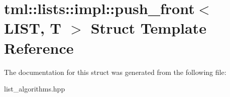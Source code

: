 \hypertarget{structtml_1_1lists_1_1impl_1_1push__front}{\section{tml\+:\+:lists\+:\+:impl\+:\+:push\+\_\+front$<$ L\+I\+S\+T, T $>$ Struct Template Reference}
\label{structtml_1_1lists_1_1impl_1_1push__front}
}


The documentation for this struct was generated from the following file\+:\begin{DoxyCompactItemize}
\item 
list\+\_\+algorithms.\+hpp\end{DoxyCompactItemize}
